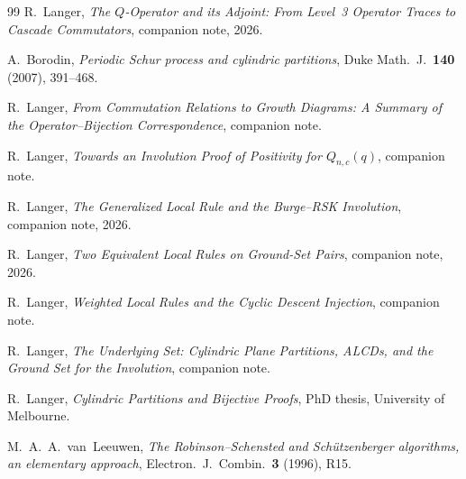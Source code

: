\documentclass[11pt]{article}
\theoremstyle{plain}
\theoremstyle{definition}
\begin{document}
\begin{thebibliography}{99}
  R.~Langer,
  \emph{The $Q$-Operator and its Adjoint: From Level~3 Operator
  Traces to Cascade Commutators},
  companion note, 2026.

  A.~Borodin,
  \emph{Periodic Schur process and cylindric partitions},
  Duke Math.~J.\ \textbf{140} (2007), 391--468.

  R.~Langer,
  \emph{From Commutation Relations to Growth Diagrams:
  A Summary of the Operator--Bijection Correspondence},
  companion note.

  R.~Langer,
  \emph{Towards an Involution Proof of Positivity for
  $Q_{n,c}(q)$},
  companion note.

  R.~Langer,
  \emph{The Generalized Local Rule and the Burge--RSK
  Involution},
  companion note, 2026.

  R.~Langer,
  \emph{Two Equivalent Local Rules on Ground-Set Pairs},
  companion note, 2026.

  R.~Langer,
  \emph{Weighted Local Rules and the Cyclic Descent
  Injection},
  companion note.

  R.~Langer,
  \emph{The Underlying Set: Cylindric Plane Partitions, ALCDs,
  and the Ground Set for the Involution},
  companion note.

  R.~Langer,
  \emph{Cylindric Partitions and Bijective Proofs},
  PhD thesis, University of Melbourne.

  M.~A.~A.~van~Leeuwen,
  \emph{The Robinson--Schensted and Sch\"utzenberger
  algorithms, an elementary approach},
  Electron.~J.~Combin.\ \textbf{3} (1996), R15.
\end{thebibliography}
\end{document}
